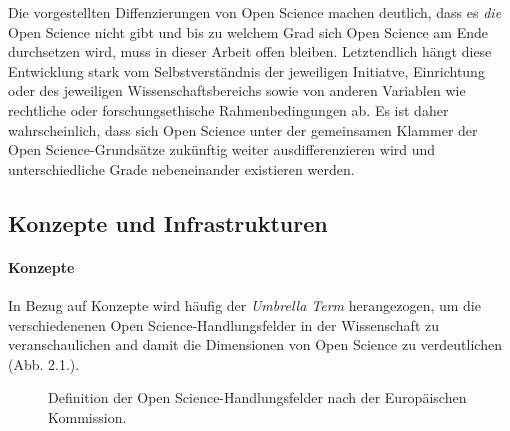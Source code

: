 Die vorgestellten Diffenzierungen von Open Science machen deutlich, dass es \textit{die} Open Science nicht gibt und bis zu welchem Grad sich Open Science am Ende durchsetzen wird, muss in dieser Arbeit offen bleiben. Letztendlich hängt diese Entwicklung stark vom Selbstverständnis der jeweiligen Initiatve, Einrichtung oder des jeweiligen Wissenschaftsbereichs sowie von anderen Variablen wie rechtliche oder forschungsethische Rahmenbedingungen ab. Es ist daher wahrscheinlich, dass sich Open Science unter der gemeinsamen Klammer der Open Science-Grundsätze zukünftig weiter ausdifferenzieren wird und unterschiedliche Grade nebeneinander existieren werden.

\subsection{Konzepte und Infrastrukturen} 

\paragraph{Konzepte}

In Bezug auf Konzepte wird häufig der \textit{Umbrella Term} herangezogen, um die verschiedenenen Open Science-Handlungsfelder in der Wissenschaft zu veranschaulichen and damit die Dimensionen von Open Science zu verdeutlichen (Abb. 2.1.). 

\begin{figure}[h]
    \centering
    \caption{Definition der Open Science-Handlungsfelder nach der Europäischen Kommission.\protect\footnotemark}
    \label{fig:x cubed graph}
\end{figure} 

